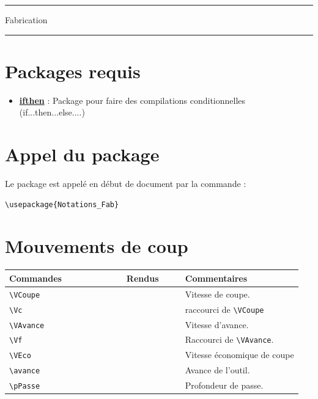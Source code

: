 \documentclass[a4paper,12pt]{article}
\begin{document}
	\begin{center}
		\hrule{\Large Fabrication}\\\hrule
	\end{center}

	\section{Packages requis}

		\begin{itemize}
			\item \href{http://www.ctan.org/pkg/ifthen}{\textbf{ifthen}} : Package pour faire des compilations conditionnelles (if...then...else....)
		\end{itemize}

	\section{Appel du package}
	
Le package est appelé en début de document par la commande :

\begin{verbatim}
\usepackage{Notations_Fab}
\end{verbatim}



	\section{Mouvements de coup}
		\noindent
		\begin{tabular}{|p{0.4\linewidth}|p{0.2\linewidth}|p{0.4\linewidth}|}
			\hline
				\textbf{Commandes}&\textbf{Rendus}&\textbf{Commentaires}
			\\\hline\hline
				\verb!\VCoupe!		&	\VCoupe		&	Vitesse de coupe.
			\\\hline
				\verb!\Vc!		&	\Vc		&	raccourci de \verb!\VCoupe!
			\\\hline
				\verb!\VAvance!		&	\VAvance		&	Vitesse d'avance.
			\\\hline
				\verb!\Vf!		&	\Vf		&	Raccourci de \verb!\VAvance!.
			\\\hline
				\verb!\VEco!		&	\VEco		&	Vitesse économique de coupe
			\\\hline
				\verb!\avance!		&	\avance		&	Avance de l'outil.
			\\\hline
				\verb!\pPasse!		&	\pPasse		&	Profondeur de passe.
			\\\hline
		\end{tabular}
\end{document}

